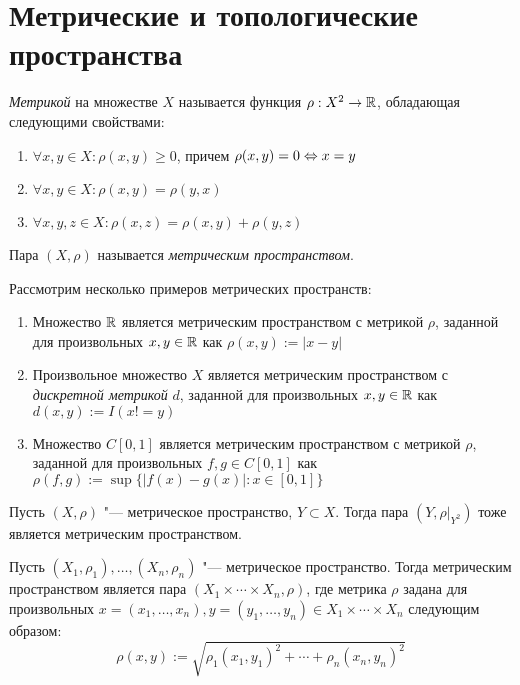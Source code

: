 \section{Метрические и топологические пространства}

\begin{definition}
	\textit{Метрикой} на множестве $X$ называется функция $\rho : X^2 \to \mathbb{R}$, обладающая следующими свойствами:
	\begin{enumerate}
		\item $\forall x, y \in X: \rho(x, y) \ge 0$, причем $\rho(x, y) = 0 \Leftrightarrow x = y$
		\item $\forall x, y \in X: \rho(x, y) = \rho(y, x)$
		\item $\forall x, y, z \in X: \rho(x, z) = \rho(x, y) + \rho(y, z)$
	\end{enumerate}
	
	Пара $(X, \rho)$ называется \textit{метрическим пространством}.
\end{definition}

\begin{example}
	Рассмотрим несколько примеров метрических пространств:
	\begin{enumerate}
		\item Множество $\mathbb{R}$ является метрическим пространством с метрикой $\rho$, заданной для произвольных $x, y \in \mathbb{R}$ как $\rho(x, y) := |x - y|$
		\item Произвольное множество $X$ является метрическим пространством с \textit{дискретной метрикой} $d$, заданной для произвольных $x, y \in \mathbb{R}$ как $d(x, y) := I(x != y)$
		\item Множество $C[0, 1]$ является метрическим пространством с метрикой $\rho$, заданной для произвольных $f, g \in C[0, 1]$ как $\rho(f, g) := \sup\{|f(x) - g(x)| : x \in [0, 1]\}$
	\end{enumerate}
\end{example}

\begin{note}
	Пусть $(X, \rho)$ "--- метрическое пространство, $Y \subset X$. Тогда пара $(Y, \rho|_{Y^2})$ тоже является метрическим пространством.
\end{note}

\begin{note}
	Пусть $(X_1, \rho_1), \dotsc, (X_n, \rho_n)$ "--- метрическое пространство. Тогда метрическим пространством является пара $(X_1 \times \dotsb \times X_n, \rho)$, где метрика $\rho$ задана для произвольных $x = (x_1, \dotsc, x_n), y = (y_1, \dotsc, y_n) \in X_1 \times \dotsb \times X_n$ следующим образом:
	\[\rho(x, y) := \sqrt{\rho_1(x_1, y_1)^2 + \dotsb + \rho_n(x_n, y_n)^2}\]
\end{note}

